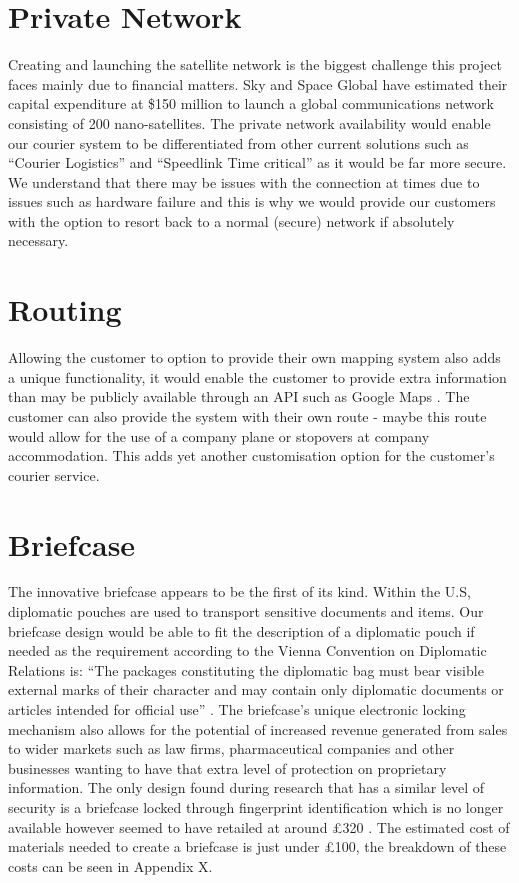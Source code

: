 


\section{Private Network}

Creating and launching the satellite network is the biggest challenge this project faces mainly due to financial matters. Sky and Space Global have estimated their capital expenditure at \$150 million to launch a global communications network consisting of 200 nano-satellites. 
The private network availability would enable our courier system to be differentiated from other current solutions such as “Courier Logistics” and “Speedlink Time critical” as it would be far more secure. We understand that there may be issues with the connection at times due to issues such as hardware failure and this is why we would provide our customers with the option to resort back to a normal (secure) network if absolutely necessary. 

\section{Routing}

Allowing the customer to option to provide their own mapping system also adds a unique functionality, it would enable the customer to provide extra information than may be publicly available through an API such as Google Maps \cite{GoogleMaps}. The customer can also provide the system with their own route - maybe this route would allow for the use of a company plane  or stopovers at company accommodation. This adds yet another customisation option  for the customer's courier service.

\section{Briefcase} \label{briefcasemarket}

The innovative briefcase appears to be the first of its kind. Within the U.S, diplomatic pouches are used to transport sensitive documents and items. Our briefcase design would be able to fit the description of a diplomatic pouch if needed as the requirement according to the Vienna Convention on Diplomatic Relations is: “The packages constituting the diplomatic bag must bear visible external marks of their character and may contain only diplomatic documents or articles intended for official use” \cite{viennaConvention}. The briefcase’s unique electronic locking mechanism also allows for the potential of increased revenue generated from sales to wider markets such as law firms, pharmaceutical companies and other businesses wanting to have that extra level of protection on proprietary information. The only design found during research that has a similar level of security is a briefcase locked through fingerprint identification which is no longer available however seemed to have retailed at around £320 \cite{fingerprintBriefcase} \cite{biometricBriefcase}. The estimated cost of materials needed to create a briefcase is just under £100, the breakdown of these costs can be seen in Appendix X. 

